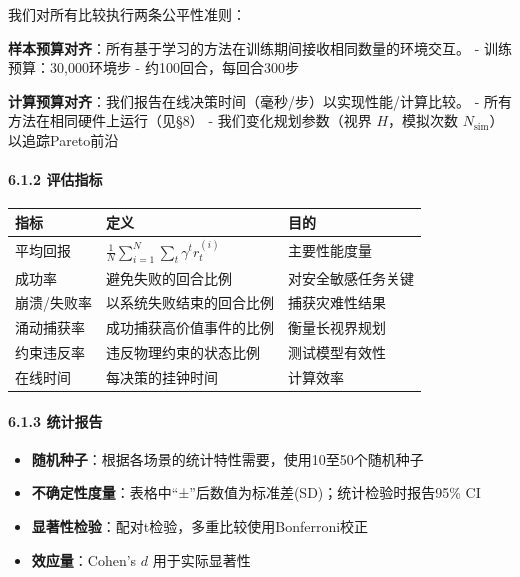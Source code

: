 \documentclass[UTF8]{ctexart}
\providecommand{\tightlist}{%
  \setlength{\itemsep}{0pt}\setlength{\parskip}{0pt}}
\let\oldparagraph\paragraph
\renewcommand{\paragraph}[1]{\oldparagraph{#1}\mbox{}}
\begin{document}
我们对所有比较执行两条公平性准则：

\textbf{样本预算对齐}：所有基于学习的方法在训练期间接收相同数量的环境交互。
- 训练预算：30,000环境步 - 约100回合，每回合300步

\textbf{计算预算对齐}：我们报告在线决策时间（毫秒/步）以实现性能/计算比较。
- 所有方法在相同硬件上运行（见§8） - 我们变化规划参数（视界
\(H\)，模拟次数 \(N_{\text{sim}}\)）以追踪Pareto前沿

\hypertarget{ux8bc4ux4f30ux6307ux6807}{%
\paragraph{6.1.2 评估指标}\label{ux8bc4ux4f30ux6307ux6807}}

\begin{table}[h]
\centering
\begin{tabular}{p{5cm}p{6cm}p{4cm}}
\toprule
\textbf{指标} & \textbf{定义} & \textbf{目的} \\
\midrule
平均回报 & \(\frac{1}{N}\sum_{i=1}^N \sum_{t} \gamma^t r_t^{(i)}\) & 主要性能度量 \\
成功率 & 避免失败的回合比例 & 对安全敏感任务关键 \\
崩溃/失败率 & 以系统失败结束的回合比例 & 捕获灾难性结果 \\
涌动捕获率 & 成功捕获高价值事件的比例 & 衡量长视界规划 \\
约束违反率 & 违反物理约束的状态比例 & 测试模型有效性 \\
在线时间 & 每决策的挂钟时间 & 计算效率 \\
\bottomrule
\end{tabular}
\end{table}

\hypertarget{ux7edfux8ba1ux62a5ux544a}{%
\paragraph{6.1.3 统计报告}\label{ux7edfux8ba1ux62a5ux544a}}

\begin{itemize}
\tightlist
\item
  \textbf{随机种子}：根据各场景的统计特性需要，使用10至50个随机种子
\item
  \textbf{不确定性度量}：表格中``±''后数值为标准差(SD)；统计检验时报告95\%
  CI
\item
  \textbf{显著性检验}：配对t检验，多重比较使用Bonferroni校正
\item
  \textbf{效应量}：Cohen's \(d\) 用于实际显著性
\end{itemize}
\end{document}
